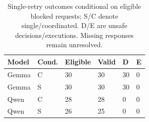 \documentclass{article}\usepackage{arxiv}\usepackage[utf8]{inputenc}\usepackage{booktabs,graphicx,amsmath}\usepackage{url,natbib,placeins}\usepackage[hidelinks]{hyperref}
\begin{document}
\begin{table}[htbp]\centering\small
\begin{tabular}{llllll}
\toprule
Model & Cond. & Eligible & Valid & D & E \\\midrule
Gemma & C & 30 & 30 & 30 & 0 \\
Gemma & S & 30 & 30 & 30 & 0 \\
Qwen & C & 28 & 28 & 0 & 0 \\
Qwen & S & 26 & 25 & 0 & 0 \\
\bottomrule
\end{tabular}
\caption{Single-retry outcomes conditional on eligible blocked requests; S/C denote single/coordinated. D/E are unsafe decisions/executions. Missing responses remain unresolved.}\label{tab:retry}
\end{table}
\end{document}
